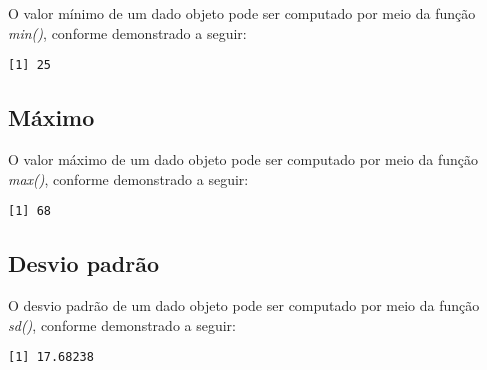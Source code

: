 \documentclass[
  letterpaper,
  DIV=11,
  numbers=noendperiod]{scrreprt}
\newenvironment{Shaded}{\begin{snugshade}}{\end{snugshade}}
\newcommand{\AttributeTok}[1]{\textcolor[rgb]{0.40,0.45,0.13}{#1}}
\newcommand{\ConstantTok}[1]{\textcolor[rgb]{0.56,0.35,0.01}{#1}}
\newcommand{\FunctionTok}[1]{\textcolor[rgb]{0.28,0.35,0.67}{#1}}
\newcommand{\NormalTok}[1]{\textcolor[rgb]{0.00,0.23,0.31}{#1}}
\newcommand{\SpecialCharTok}[1]{\textcolor[rgb]{0.37,0.37,0.37}{#1}}
\begin{document}
O valor mínimo de um dado objeto pode ser computado por meio da função
\emph{min()}, conforme demonstrado a seguir:

\begin{Shaded}
\end{Shaded}

\begin{verbatim}
[1] 25
\end{verbatim}

\subsection{Máximo}\label{muxe1ximo}

O valor máximo de um dado objeto pode ser computado por meio da função
\emph{max()}, conforme demonstrado a seguir:

\begin{Shaded}
\end{Shaded}

\begin{verbatim}
[1] 68
\end{verbatim}

\subsection{Desvio padrão}\label{desvio-padruxe3o}

O desvio padrão de um dado objeto pode ser computado por meio da função
\emph{sd()}, conforme demonstrado a seguir:

\begin{Shaded}
\end{Shaded}

\begin{verbatim}
[1] 17.68238
\end{verbatim}
\end{document}
